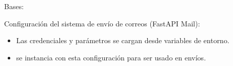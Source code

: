 \documentclass[letterpaper,10pt,spanish]{sphinxmanual}
\begin{document}
\begin{fulllineitems}
\label{\detokenize{endpoints:main.Base}}
\pysigstartsignatures
\pysiglinewithargsret
{}
{}
{}
\pysigstopsignatures
\sphinxAtStartPar
Bases: 

\sphinxAtStartPar
Configuración del sistema de envío de correos (FastAPI Mail):
\begin{itemize}
\item {} 
\sphinxAtStartPar
Las credenciales y parámetros se cargan desde variables de entorno.

\item {} 
\sphinxAtStartPar
{} se instancia con esta configuración para ser usado en envíos.

\end{itemize}

\begin{fulllineitems}
\label{\detokenize{endpoints:main.Base.metadata}}
\pysigstartsignatures
\pysigline
{}
\pysigstopsignatures
\end{fulllineitems}


\begin{fulllineitems}
\label{\detokenize{endpoints:main.Base.registry}}
\pysigstartsignatures
\pysigline
{}
\pysigstopsignatures
\end{fulllineitems}


\end{fulllineitems}

\end{document}
